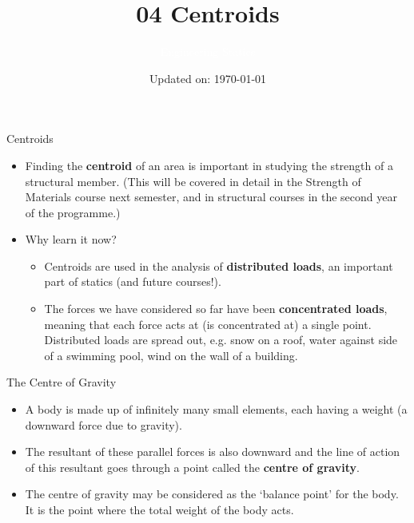 \documentclass[9pt, xcolor={svgnames, x11names},professionalfonts]{beamer}
\title[Centroids]{\Huge 04 Centroids}
\subtitle[Engineering Statics]{\Large\textcolor{white}{Engineering Statics}}
\author{}
\date{\small Updated on: \today}
\begin{document}

\begin{frame}[plain]    %
	\titlepage
\end{frame}


\begin{frame}{Centroids}
	\begin{itemize}
		\item Finding the {\bfseries centroid} of an area is important in studying the strength of a structural member. (This will be covered in detail in the Strength of Materials course next semester, and in structural courses in the second year of the programme.)\parb
		\item Why learn it now?
		      \pause
		      \parm
		      \begin{itemize}
		      	\item Centroids are used in the analysis of {\bfseries distributed loads}, an important part of statics (and future courses!). \parb\pause
		      	\item The forces we have considered so far have been {\bfseries concentrated loads}, meaning that each force acts at (is concentrated at) a single point. Distributed loads are spread out, e.g. snow on a roof, water against side of a swimming pool, wind on the wall of a building.
		      \end{itemize}
	\end{itemize}
\end{frame}

\begin{frame}{The Centre of Gravity}
	\begin{itemize}
		\item  A body is made up of infinitely many small elements, each having a weight (a downward force due to gravity).\parb
		\item The resultant of these parallel forces is also downward and the line of action of this resultant goes through a point called the {\bfseries centre of gravity}. \parm
		\item The centre of gravity may be considered as the `balance point' for the body. It is the point where the total weight of the body acts.

	\end{itemize}

	\centering
	
\end{frame}
\end{document}
